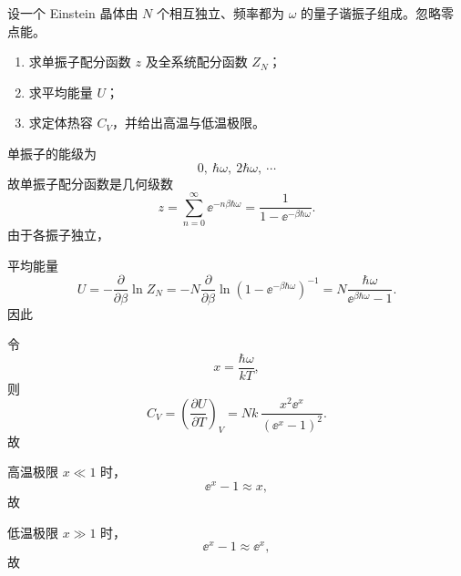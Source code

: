 \begin{question}[16分]
设一个 Einstein 晶体由 $N$ 个相互独立、频率都为 $\omega$ 的量子谐振子组成。忽略零点能。
\begin{enumerate}[label=(\arabic*),leftmargin=2.8em,itemsep=0.2em]
\item 求单振子配分函数 $z$ 及全系统配分函数 $Z_N$；
\item 求平均能量 $U$；
\item 求定体热容 $C_V$，并给出高温与低温极限。
\end{enumerate}
\begin{solution}

单振子的能级为
\[
0,\ \hbar\omega,\ 2\hbar\omega,\ \cdots
\]
故单振子配分函数是几何级数
\[
z=\sum_{n=0}^{\infty}\ee^{-n\beta\hbar\omega}
=\frac{1}{1-\ee^{-\beta\hbar\omega}}.
\]
由于各振子独立，

平均能量
\[
U=-\frac{\partial}{\partial\beta}\ln Z_N
=-N\frac{\partial}{\partial\beta}\ln\left(1-\ee^{-\beta\hbar\omega}\right)^{-1}
= N\frac{\hbar\omega}{\ee^{\beta\hbar\omega}-1}.
\]
因此

令
\[
x=\frac{\hbar\omega}{kT},
\]
则
\[
C_V=\left(\frac{\partial U}{\partial T}\right)_V
=Nk\,\frac{x^2\ee^x}{(\ee^x-1)^2}.
\]
故

高温极限 $x\ll1$ 时，
\[
\ee^x-1\approx x,
\]
故

低温极限 $x\gg1$ 时，
\[
\ee^x-1\approx \ee^x,
\]
故
\end{solution}
\end{question}

